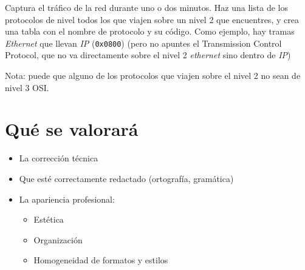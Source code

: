 \begin{homeworkProblem}
  Captura el tráfico de la red durante uno o dos minutos. Haz una lista de los protocolos de nivel todos los que viajen sobre un nivel 2 que encuentres, y crea una tabla con el nombre de protocolo y su código. Como ejemplo, hay tramas \textit{Ethernet} que llevan \textit{IP} (\texttt{0x0800}) (pero no apuntes el Transmission Control Protocol, que no va directamente sobre el nivel 2 \textit{ethernet} sino dentro de \textit{IP})
  
  \small{Nota: puede que alguno de los protocolos que viajen sobre el nivel 2 no sean de nivel 3 OSI.}
\end{homeworkProblem}


\section{Qué se valorará}

\begin{itemize}
\item La corrección técnica 
\item Que esté correctamente redactado (ortografía, gramática)
\item La apariencia profesional:
  \begin{itemize}
  \item Estética
  \item Organización
  \item Homogeneidad de formatos y estilos
  \end{itemize}
\end{itemize}

